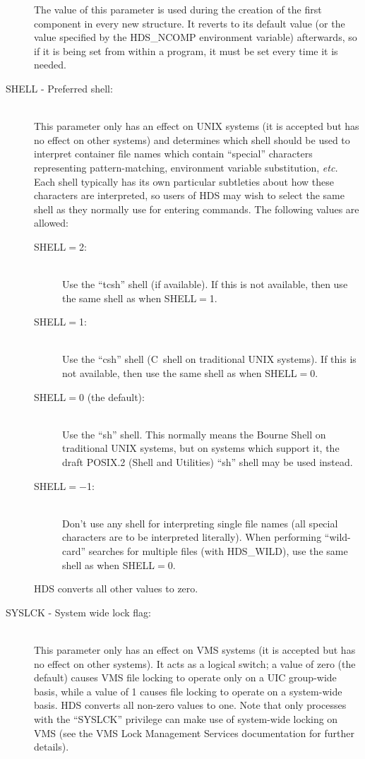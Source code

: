 \begin{description}
The value of this parameter is used during the creation of the first component
in every new structure.  It reverts to its default value (or the value specified
by the HDS\_NCOMP environment variable) afterwards, so if it is being set from
within a program, it must be set every time it is needed.

\item [SHELL - Preferred shell:]\mbox{}\\
This parameter only has an effect on UNIX systems (it is accepted but has no
effect on other systems) and determines which shell should be used to interpret
container file names which contain ``special'' characters representing
pattern-matching, environment variable substitution, {\em etc.} Each shell
typically has its own particular subtleties about how these characters are
interpreted, so users of HDS may wish to select the same shell as they normally
use for entering commands. The following values are allowed:

\begin{description}
\item[SHELL$=$2:]\mbox{}\\
Use the ``tcsh'' shell (if available). If this is not available, then use the
same shell as when SHELL$=$1.

\item[SHELL$=$1:]\mbox{}\\
Use the ``csh'' shell (C~shell on traditional UNIX systems). If this is not
available, then use the same shell as when SHELL$=$0.

\item[SHELL$=$0 (the default):]\mbox{}\\
Use the ``sh'' shell. This normally means the Bourne Shell on traditional UNIX
systems, but on systems which support it, the draft POSIX.2 (Shell and
Utilities) ``sh'' shell may be used instead.

\item[SHELL$=-$1:]\mbox{}\\
Don't use any shell for interpreting single file names (all special characters
are to be interpreted literally). When performing ``wild-card'' searches for
multiple files (with HDS\_WILD), use the same shell as when SHELL$=$0.
\end{description}

HDS converts all other values to zero.

\item [SYSLCK - System wide lock flag:]\mbox{}\\
This parameter only has an effect on VMS systems (it is accepted but has no
effect on other systems). It acts as a logical switch; a value of zero (the
default) causes VMS file locking to operate only on a UIC group-wide basis,
while a  value of 1 causes file locking to operate on a system-wide basis. HDS
converts all non-zero values to one. Note that only processes with the
``SYSLCK'' privilege can make use of system-wide locking on VMS (see the VMS
Lock Management Services documentation for further details).


\end{description}
